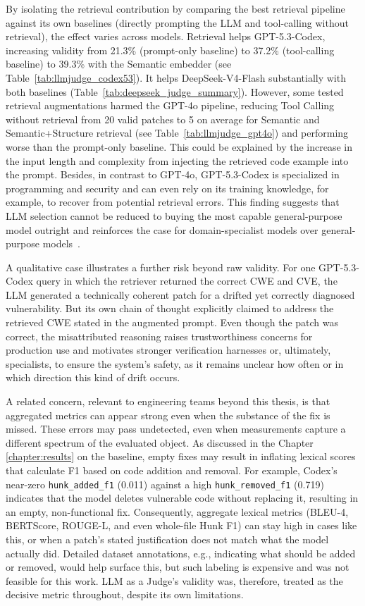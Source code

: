 By isolating the retrieval contribution by comparing the best retrieval pipeline against its own baselines (directly prompting the LLM and tool-calling without retrieval), the effect varies across models. 
Retrieval helps GPT-5.3-Codex, increasing validity from 21.3\% (prompt-only baseline) to 37.2\% (tool-calling baseline) to 39.3\% with the Semantic embedder (see Table~\ref{tab:llmjudge_codex53}).
It helps DeepSeek-V4-Flash substantially with both baselines (Table~\ref{tab:deepseek_judge_summary}).
However, some tested retrieval augmentations harmed the GPT-4o pipeline, reducing Tool Calling without retrieval from 20 valid patches to 5 on average for Semantic and Semantic+Structure retrieval (see Table~\ref{tab:llmjudge_gpt4o}) and performing worse than the prompt-only baseline. 
This could be explained by the increase in the input length and complexity from injecting the retrieved code example into the prompt. Besides, in contrast to GPT-4o, GPT-5.3-Codex is specialized in programming and security and can even rely on its training knowledge, for example, to recover from potential retrieval errors.
This finding suggests that LLM selection cannot be reduced to buying the most capable general-purpose model outright and reinforces the case for domain-specialist models over general-purpose models~\cite{vulnerabilityhallucination}.
 
A qualitative case illustrates a further risk beyond raw validity.
For one GPT-5.3-Codex query in which the retriever returned the correct CWE and CVE, the LLM generated a technically coherent patch for a drifted yet correctly diagnosed vulnerability. But its own chain of thought explicitly claimed to address the retrieved CWE stated in the augmented prompt. 
Even though the patch was correct, the misattributed reasoning raises trustworthiness concerns for production use and motivates stronger verification harnesses or, ultimately, specialists, to ensure the system's safety, as it remains unclear how often or in which direction this kind of drift occurs.

A related concern, relevant to engineering teams beyond this thesis, is that aggregated metrics can appear strong even when the substance of the fix is missed.
These errors may pass undetected, even when measurements capture a different spectrum of the evaluated object. 
As discussed in the Chapter \ref{chapter:results} on the baseline, empty fixes may result in inflating lexical scores that calculate F1 based on code addition and removal. For example, Codex's near-zero \texttt{hunk\_added\_f1} (0.011) against a high \texttt{hunk\_removed\_f1} (0.719) indicates that the model deletes vulnerable code without replacing it, resulting in an empty, non-functional fix. 
Consequently, aggregate lexical metrics (BLEU-4, BERTScore, ROUGE-L, and even whole-file Hunk F1) can stay high in cases like this, or when a patch's stated justification does not match what the model actually did. 
Detailed dataset annotations, e.g., indicating what should be added or removed, would help surface this, but such labeling is expensive and was not feasible for this work.
LLM as a Judge's validity was, therefore, treated as the decisive metric throughout, despite its own limitations.
 
